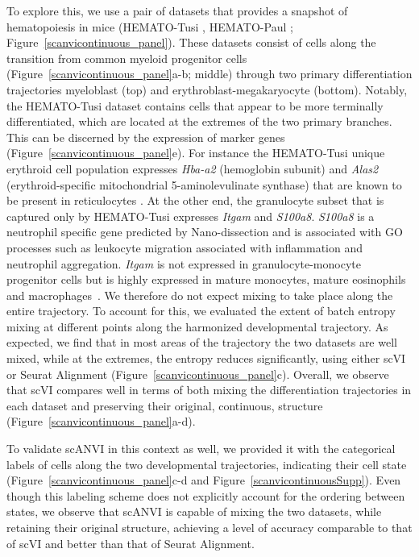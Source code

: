 To explore this, we use a pair of datasets that provides a snapshot of hematopoiesis in mice (HEMATO-Tusi \cite{Tusi2018}, HEMATO-Paul \cite{PAUL2015}; Figure~\ref{scanvicontinuous_panel}). These datasets consist of cells along the transition from common myeloid progenitor cells (Figure~\ref{scanvicontinuous_panel}a-b; middle) through two primary differentiation trajectories myeloblast (top) and erythroblast-megakaryocyte (bottom). Notably, the HEMATO-Tusi dataset contains cells that appear to be more terminally differentiated, which are located at the extremes of the two primary branches. This can be discerned by the expression of marker genes (Figure~\ref{scanvicontinuous_panel}e). For instance the HEMATO-Tusi unique erythroid cell population expresses \textit{Hba-a2} (hemoglobin subunit) and \textit{Alas2} (erythroid-specific mitochondrial 5-aminolevulinate synthase) that are known to be present in reticulocytes \cite{Ery2007,MTAB}. At the other end, the granulocyte subset that is captured only by HEMATO-Tusi expresses \textit{Itgam} and \textit{S100a8}. \textit{S100a8} is a neutrophil specific gene predicted by Nano-dissection \cite{nano2013} and is associated with GO processes such as leukocyte migration associated with inflammation and neutrophil aggregation. \textit{Itgam} is not expressed in granulocyte-monocyte progenitor cells but is highly expressed in mature monocytes, mature eosinophils and macrophages~\cite{papatheodorou2017expression}. We therefore do not expect mixing to take place along the entire trajectory. To account for this, we evaluated the extent of batch entropy mixing at different points along the harmonized developmental trajectory. As expected, we find that in most areas of the trajectory the two datasets are well mixed, while at the extremes, the entropy reduces significantly, using either scVI or Seurat Alignment (Figure~\ref{scanvicontinuous_panel}c). Overall, we observe that scVI compares well in terms of both mixing the differentiation trajectories in each dataset and preserving their original, continuous, structure (Figure~\ref{scanvicontinuous_panel}a-d). 

To validate scANVI in this context as well, we provided it with the categorical labels of cells along the two developmental trajectories, indicating their cell state (Figure~\ref{scanvicontinuous_panel}c-d and Figure~\ref{scanvicontinuousSupp}). Even though this labeling scheme does not explicitly account for the ordering between states, we observe that scANVI is capable of mixing the two datasets, while retaining their original structure, achieving a level of accuracy comparable to that of scVI and better than that of Seurat Alignment. 


